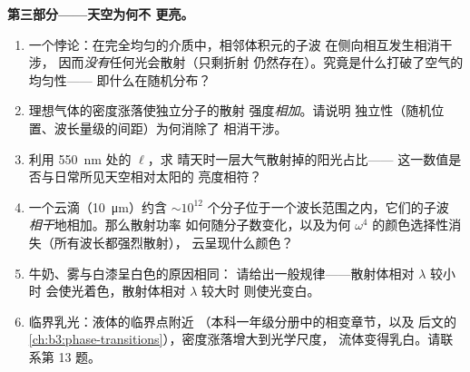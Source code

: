 \begin{problem}
\medskip\noindent\textbf{第三部分——天空为何不
更亮。}
\begin{enumerate}[resume]
  \item 一个悖论：在完全均匀的介质中，相邻体积元的子波
        在侧向相互发生相消干涉，
        因而\emph{没有}任何光会散射（只剩折射
        仍然存在）。究竟是什么打破了空气的均匀性——
        即什么在随机分布？
  \item 理想气体的密度涨落使独立分子的散射
        强度\emph{相加}。请说明
        独立性（随机位置、波长量级的间距）为何消除了
        相消干涉。
  \item 利用 \qty{550}{nm} 处的 $\ell$，求
        晴天时一层大气散射掉的阳光占比——
        这一数值是否与日常所见天空相对太阳的
        亮度相符？
  \item 一个云滴（\qty{10}{\micro m}）约含 $\sim10^{12}$
        个分子位于一个波长范围之内，它们的子波
        \emph{相干}地相加。那么散射功率
        如何随分子数变化，以及为何 $\omega^4$
        的颜色选择性消失（所有波长都强烈散射），
        云呈现什么颜色？
  \item 牛奶、雾与白漆呈白色的原因相同：
        请给出一般规律——散射体相对 $\lambda$ 较小时
        会使光着色，散射体相对 $\lambda$ 较大时
        则使光变白。
  \item 临界乳光：液体的临界点附近
        （本科一年级分册中的相变章节，以及
        后文的\cref{ch:b3:phase-transitions}），密度涨落增大到光学尺度，
        流体变得乳白。请联系第 13 题。
\end{enumerate}


\end{problem}
